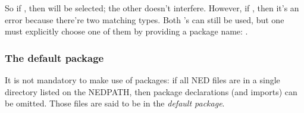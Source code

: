 So if , then
 will be selected; the other
 doesn't interfere. However, if
, then it's an error because there're two
matching  types. Both 's can still be used,
but one must explicitly choose one of them by providing a package name:
.


\subsubsection{The default package}

It is not mandatory to make use of packages: if all NED files are in a
single directory listed on the NEDPATH, then package declarations (and
imports) can be omitted. Those files are said to be in the \textit{default
package}.






